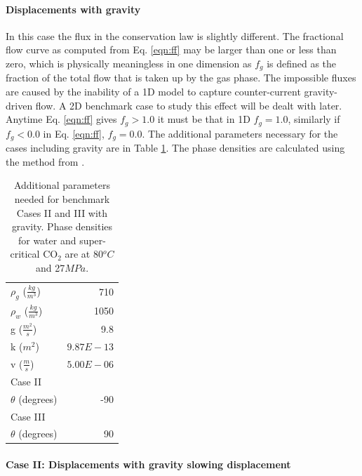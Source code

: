 \paragraph{Displacements with gravity}

In this case the flux in the conservation law is slightly different.  The fractional flow curve as computed from Eq. \ref{eqn:ff} may be larger than one or less than zero, which is physically meaningless in one dimension as $f_g$ is defined as the fraction of the total flow that is taken up by the gas phase.  The impossible fluxes are caused by the inability of a 1D model to capture counter-current gravity-driven flow.  A 2D benchmark case to study this effect will be dealt with later.  Anytime Eq. \ref{eqn:ff} gives $f_g > 1.0$ it must be that in 1D $f_g = 1.0$, similarly if $f_g < 0.0$ in Eq. \ref{eqn:ff}, $f_g = 0.0$.  The additional parameters necessary for the cases including gravity are in Table \ref{table:grav_const}.  The phase densities are calculated using the method from \cite{spycher_2003}.


\begin{table}[h]
\begin{center}
\begin{tabular}{lr}
\hline
$\rho_g$ ($\frac{kg}{m^3}$)& 710 \\
$\rho_w$ ($\frac{kg}{m^3}$)& 1050\\
g ($\frac{m^2}{s}$)& 9.8 \\
k ($ m^2$)& $9.87E-13$\\
v ($ \frac{m}{s}$)& $5.00E-06$\\
\hline
Case II &\\
$\theta$ (degrees) & -90 \\
\hline
Case III &\\
$\theta$  (degrees)& 90  \\
\hline
\end{tabular}
\caption{Additional parameters needed for benchmark Cases II and III with gravity. Phase densities for water and super-critical CO$_2$ are at 80$^oC$ and 27$MPa$. }
\label{table:grav_const}
\end{center}
\end{table}



\paragraph{Case II: Displacements with gravity slowing displacement}

